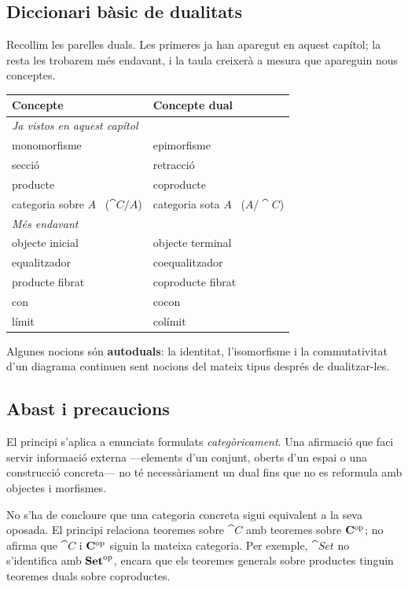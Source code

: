 \subsection{Diccionari bàsic de dualitats}

Recollim les parelles duals. Les primeres ja han aparegut en aquest capítol; la resta les trobarem més endavant, i la taula creixerà a mesura que apareguin nous conceptes.
\begin{center}
\begin{tabular}{ll}
\hline
\textbf{Concepte} & \textbf{Concepte dual}\\
\hline
\multicolumn{2}{l}{\emph{Ja vistos en aquest capítol}}\\
monomorfisme & epimorfisme\\
secció & retracció\\
producte & coproducte\\
categoria sobre $A$ \ ($\cat{C}/A$) & categoria sota $A$ \ ($A/\cat{C}$)\\
\hline
\multicolumn{2}{l}{\emph{Més endavant}}\\
objecte inicial & objecte terminal\\
equalitzador & coequalitzador\\
producte fibrat & coproducte fibrat\\
con & cocon\\
límit & colímit\\
\hline
\end{tabular}
\end{center}
Algunes nocions són \textbf{autoduals}: la identitat, l'isomorfisme i la commutativitat d'un diagrama continuen sent nocions del mateix tipus després de dualitzar-les.

\subsection{Abast i precaucions}

El principi s'aplica a enunciats formulats \emph{categòricament}. Una afirmació que faci servir informació externa ---elements d'un conjunt, oberts d'un espai o una construcció concreta--- no té necessàriament un dual fins que no es reformula amb objectes i morfismes.

No s'ha de concloure que una categoria concreta sigui equivalent a la seva oposada. El principi relaciona teoremes sobre $\cat{C}$ amb teoremes sobre $\mathbf{C}^{\mathrm{op}}$; no afirma que $\cat{C}$ i $\mathbf{C}^{\mathrm{op}}$ siguin la mateixa categoria. Per exemple, $\cat{Set}$ no s'identifica amb $\mathbf{Set}^{\mathrm{op}}$, encara que els teoremes generals sobre productes tinguin teoremes duals sobre coproductes.

